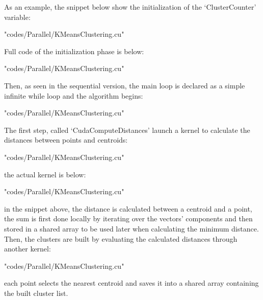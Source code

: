 \documentclass[10pt,twocolumn,letterpaper]{article}
\begin{document}
As an example, the snippet below show the initialization of the `ClusterCounter' variable:\\
\begin{lstinputlisting}[language=C,style=CSnippetStyle,caption=CUDA Example Initialization,firstline=207,lastline=219]{
	"codes/Parallel/KMeansClustering.cu"}
\end{lstinputlisting}
Full code of the initialization phase is below:\\
\begin{lstinputlisting}[language=C,style=CSnippetStyle,caption=CUDA Main Initialization Code,firstline=272,lastline=280]{
	"codes/Parallel/KMeansClustering.cu"}
\end{lstinputlisting}
Then, as seen in the sequential version, the main loop is declared as a simple infinite while loop and the algorithm begins:\\
\begin{lstinputlisting}[language=C,style=CSnippetStyle,caption=CUDA Main Loop,firstline=284,lastline=295]{
	"codes/Parallel/KMeansClustering.cu"}
\end{lstinputlisting}
The first step, called `CudaComputeDistances' launch a kernel to calculate the distances between points and centroids:
\begin{lstinputlisting}[language=C,style=CSnippetStyle,caption=CUDA Distance Calculator Kernel Launcher,firstline=132,lastline=141]{
	"codes/Parallel/KMeansClustering.cu"}
\end{lstinputlisting}
the actual kernel is below:\\
\begin{lstinputlisting}[language=C,style=CSnippetStyle,caption=CUDA Distance Calculator Kernel,firstline=81,lastline=103]{
	"codes/Parallel/KMeansClustering.cu"}
\end{lstinputlisting}
in the snippet above, the distance is calculated between a centroid and a point, the sum is first done locally by iterating over the 
vectors' components and then stored in a shared array to be used later when calculating the minimum distance.\\
Then, the clusters are built by evaluating the calculated distances through another kernel:\\
\begin{lstinputlisting}[language=C,style=CSnippetStyle,caption=CUDA Cluster Builder Kernel,firstline=60,lastline=79]{
	"codes/Parallel/KMeansClustering.cu"}
\end{lstinputlisting}
each point selects the nearest centroid and saves it into a shared array containing the built cluster list.\\
\end{document}
